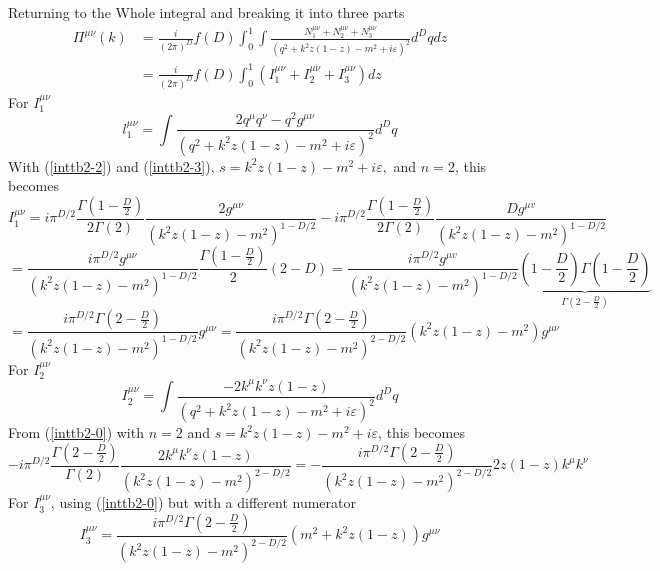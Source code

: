 Returning to the Whole integral and breaking it into three parts
\begin{equation}\begin{aligned}
\Pi^{\mu \nu}(k) &=\frac{i}{(2 \pi)^{D}} f(D) \int_{0}^{1} \int \frac{N_{1}^{\mu \nu}+N_{2}^{\mu \nu}+N_{3}^{\mu \nu}}{\left(q^{2}+k^{2} z(1-z)-m^{2}+i \varepsilon\right)^{2}} d^{D} q d z \\
&=\frac{i}{(2 \pi)^{D}} f(D) \int_{0}^{1}\left(I_{1}^{\mu \nu}+I_{2}^{\mu \nu}+I_{3}^{\mu \nu}\right) d z
\end{aligned}\end{equation}
For $I^{\mu\nu}_1$
\begin{equation}l_{1}^{\mu \nu}=\int \frac{2 q^{\mu} q^{\nu}-q^{2} g^{\mu \nu}}{\left(q^{2}+k^{2} z(1-z)-m^{2}+i \varepsilon\right)^{2}} d^{D} q\end{equation}
With (\ref{inttb2-2}) and (\ref{inttb2-3}), $s=k^{2} z(1-z)-m^{2}+i \varepsilon,$ and $n=2$, this becomes
$$
I_1^{\mu\nu}=i \pi^{D / 2} \frac{\Gamma\left(1-\frac{D}{2}\right)}{2 \Gamma(2)} \frac{2 g^{\mu \nu}}{\left(k^{2} z(1-z)-m^{2}\right)^{1-D / 2}}-i \pi^{D / 2} \frac{\Gamma\left(1-\frac{D}{2}\right)}{2 \Gamma(2)} \frac{D g^{\mu v}}{\left(k^{2} z(1-z)-m^{2}\right)^{1-D / 2}}
$$
$$=\frac{i \pi^{D / 2} g^{\mu \nu}}{\left(k^{2} z(1-z)-m^{2}\right)^{1-D / 2}} \frac{\Gamma\left(1-\frac{D}{2}\right)}{2}(2-D)=\frac{i \pi^{D / 2} g^{\mu v}}{\left(k^{2} z(1-z)-m^{2}\right)^{1-D / 2}} \underbrace{\left(1-\frac{D}{2}\right) \Gamma\left(1-\frac{D}{2}\right)}_{\Gamma\left(2-\frac{D}{2}\right)}
$$
$$=\frac{i \pi^{D / 2} \Gamma\left(2-\frac{D}{2}\right)}{\left(k^{2} z(1-z)-m^{2}\right)^{1-D / 2}} g^{\mu \nu}=\frac{i \pi^{D / 2} \Gamma\left(2-\frac{D}{2}\right)}{\left(k^{2} z(1-z)-m^{2}\right)^{2-D / 2}}\left(k^{2} z(1-z)-m^{2}\right) g^{\mu \nu}
$$
For $I_2^{\mu\nu}$
\begin{equation}I_{2}^{\mu \nu}=\int \frac{-2 k^{\mu} k^{\nu} z(1-z)}{\left(q^{2}+k^{2} z(1-z)-m^{2}+i \varepsilon\right)^{2}} d^{D} q\end{equation}
From (\ref{inttb2-0}) with $n=2$ and $s=k^2z(1-z)-m^2+i\varepsilon$, this becomes
$$-i \pi^{D / 2} \frac{\Gamma\left(2-\frac{D}{2}\right)}{\Gamma(2)} \frac{2 k^{\mu} k^{\nu} z(1-z)}{\left(k^{2} z(1-z)-m^{2}\right)^{2-D / 2}}=-\frac{i \pi^{D / 2} \Gamma\left(2-\frac{D}{2}\right)}{\left(k^{2} z(1-z)-m^{2}\right)^{2-D / 2}} 2 z(1-z) k^{\mu} k^{\nu}$$
For $I_3^{\mu\nu}$, using (\ref{inttb2-0}) but with a different numerator
\begin{equation}I_{3}^{\mu \nu}=\frac{i \pi^{D / 2} \Gamma\left(2-\frac{D}{2}\right)}{\left(k^{2} z(1-z)-m^{2}\right)^{2-D / 2}}\left(m^{2}+k^{2} z(1-z)\right) g^{\mu \nu}\end{equation}

